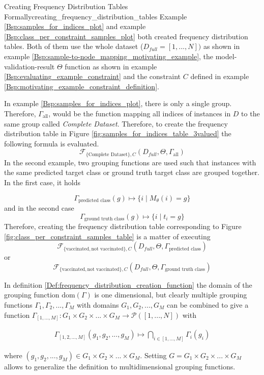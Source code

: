 \begin{Bsp}{Creating Frequency Distribution Tables Formally}{creating_frequency_distribution_tables}
Example \ref{Bsp:samples_for_indices_plot} and example \ref{Bsp:class_per_constraint_samples_plot} both created frequency distribution tables. Both of them use the whole dataset ($D_{full} = [1,...,N])$ as shown in example \ref{Bsp:sample-to-node_mapping_motivating_example}, the model-validation-result $\Theta$ function as shown in example \ref{Bsp:evaluating_example_constraint} and the constraint $C$ defined in example \ref{Bsp:motivating_example_constraint_definition}. 

In example \ref{Bsp:samples_for_indices_plot}, there is only a single group. Therefore, $\Gamma_\textrm{all}$, would be the function mapping all indices of instances in $D$ to the same group called \emph{Complete Dataset}. Therefore, to create the frequency distribution table in Figure \ref{fig:samples_for_indices_table_3valued} the following formula is evaluated.
\[
    \mathcal{F}_{\{\textrm{Complete Dataset}\},C}(D_{full},\Theta, \Gamma_{\textrm{all}})
\]
In the second example, two grouping functions are used such that instances with the same predicted target class or ground truth target class are grouped together. In the first case, it holds

\[\Gamma_{\textrm{predicted class}}(g) \mapsto \{i \mid M_\theta(i) = g\}\]
and in the second case
\[\Gamma_{\textrm{ground truth class}}(g) \mapsto \{i \mid t_i = g\}\]
Therefore, creating the frequency distribution table corresponding to Figure \ref{fig:class_per_constraint_samples_table} is a matter of executing
\[
    \mathcal{F}_{\{\textrm{vaccinated}, \textrm{not vaccinated}\},C}(D_{full},\Theta, \Gamma_{\textrm{predicted class}})
\]
or 
\[
    \mathcal{F}_{\{\textrm{vaccinated}, \textrm{not vaccinated}\},C}(D_{full},\Theta, \Gamma_{\textrm{ground truth class}})
\]
\end{Bsp}

In definition \ref{Def:frequency_distribution_creation_function} the domain of the grouping function $\textrm{dom}(\Gamma)$ is one dimensional, but clearly multiple grouping functions $\Gamma_1,\Gamma_2,...,\Gamma_M$ with domains $G_1,G_2,...,G_M$ can be combined to give a function $\Gamma_{[1,...,M]}: G_1 \times G_2 \times... \times G_M \to \mathcal{P}([1,...,N])$ with

\begin{gather}
    \Gamma_{[1,2,...,M]}(g_1,g_2,...,g_M) \mapsto \bigcap_{i \in [1,...,M]} \Gamma_i(g_i) \label{multiple_grouping_functions_to_one}
\end{gather}

where $(g_1,g_2,...,g_M) \in G_1 \times G_2 \times ... \times G_M$. Setting $G = G_1 \times G_2 \times ... \times G_M$ allows to generalize the definition to multidimensional grouping functions.

